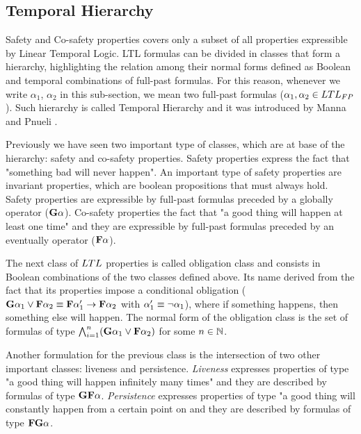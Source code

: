 \subsection{Temporal Hierarchy}
Safety and Co-safety properties covers only a subset of all properties expressible by Linear Temporal Logic.
LTL formulas can be divided in classes that form a hierarchy, highlighting the relation among their normal forms defined as Boolean and temporal combinations of full-past formulas. For this reason, whenever we write $\alpha_1$, $\alpha_2$ in this sub-section, we mean two full-past formulas ($\alpha_1,\alpha_2 \in LTL_{FP}$).
Such hierarchy is called Temporal Hierarchy and it was introduced by Manna and Pnueli \cite{pnueli1990}.

Previously we have seen two important type of classes, which are at base of the hierarchy: safety and co-safety properties. 
Safety properties express the fact that "something bad will never happen". An important type of safety properties are invariant properties, which are boolean propositions that must always hold. 
Safety properties are expressible by full-past formulas preceded by a globally operator ($\mathbf{G} \alpha$).
Co-safety properties the fact that "a good thing will happen at least one time" and they are expressible by full-past formulas preceded by an eventually operator ($\mathbf{F} \alpha$).

The next class of $LTL$ properties is called obligation class and consists in Boolean combinations of the two classes defined above. 
Its name derived from the fact that its properties impose a conditional obligation ($\mathbf{G} \alpha_1 \lor \mathbf{F} \alpha_2 \equiv \mathbf{F} \alpha_1' \to \mathbf{F} \alpha_2$ with $\alpha_1' \equiv \neg \alpha_1$), where if something happens, then something else will happen. The normal form of the obligation class is the set of formulas of type $\bigwedge_{i=1}^n(\mathbf{G} \alpha_1 \lor \mathbf{F} \alpha_2)$ for some $n \in \mathbb{N}$.

Another formulation for the previous class is the intersection of two other important classes: liveness and persistence. 
\textit{Liveness} expresses properties of type "a good thing will happen infinitely many times" and they are described by formulas of type $\mathbf{G} \mathbf{F} \alpha$. 
\textit{Persistence} expresses properties of type "a good thing will constantly happen from a certain point on and they are described by formulas of type $\mathbf{F} \mathbf{G} \alpha$.

